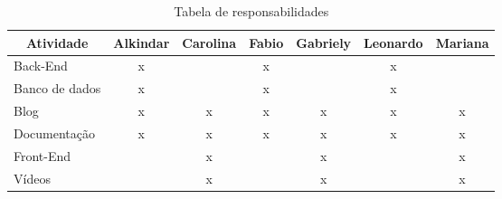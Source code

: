 \begin{center}
  \begin{table}
    \begin{tabular}{|l|c|c|c|c|c|c|}
      \hline
      \multicolumn{1}{|c|}{\textbf{Atividade}} & \textbf{Alkindar}     & \textbf{Carolina}     & \textbf{Fabio}        & \textbf{Gabriely}     & \textbf{Leonardo}     & \textbf{Mariana}      \\ \hline
      Back-End                                 & x                     & \multicolumn{1}{l|}{} & x                     & \multicolumn{1}{l|}{} & x                     & \multicolumn{1}{l|}{} \\ \hline
      Banco de dados                           & x                     & \multicolumn{1}{l|}{} & x                     & \multicolumn{1}{l|}{} & x                     & \multicolumn{1}{l|}{} \\ \hline
      Blog                                     & x                     & x                     & x                     & x                     & x                     & x                     \\ \hline
      Documentação                             & x                     & x                     & x                     & x                     & x                     & x                     \\ \hline
      Front-End                                & \multicolumn{1}{l|}{} & x                     & \multicolumn{1}{l|}{} & x                     & \multicolumn{1}{l|}{} & x                     \\ \hline
      Vídeos                                   & \multicolumn{1}{l|}{} & x                     & \multicolumn{1}{l|}{} & x                     & \multicolumn{1}{l|}{} & x                     \\ \hline
    \end{tabular}

    \caption{Tabela de responsabilidades}\label{tab:tab_resp}
  \end{table}
\end{center}

